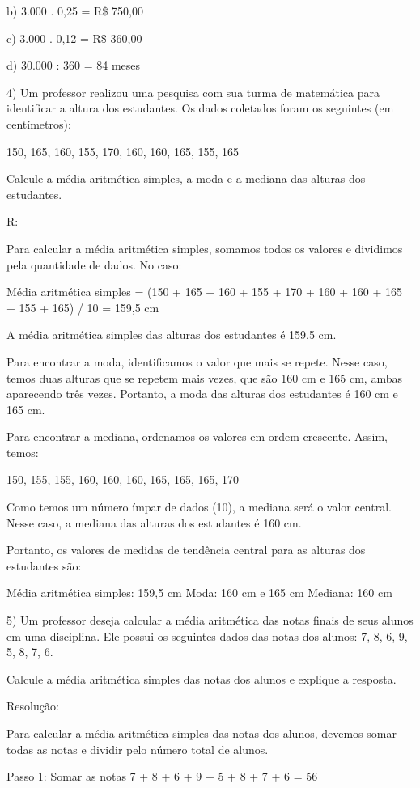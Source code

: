 b) 3.000 . 0,25 = R\$ 750,00

c) 3.000 . 0,12 = R\$ 360,00

d) 30.000 : 360 = 84 meses

4) Um professor realizou uma pesquisa com sua turma de matemática para
identificar a altura dos estudantes. Os dados coletados foram os
seguintes (em centímetros):

150, 165, 160, 155, 170, 160, 160, 165, 155, 165

Calcule a média aritmética simples, a moda e a mediana das alturas dos
estudantes.

R:

Para calcular a média aritmética simples, somamos todos os valores e
dividimos pela quantidade de dados. No caso:

Média aritmética simples = (150 + 165 + 160 + 155 + 170 + 160 + 160 +
165 + 155 + 165) / 10 = 159,5 cm

A média aritmética simples das alturas dos estudantes é 159,5 cm.

Para encontrar a moda, identificamos o valor que mais se repete. Nesse
caso, temos duas alturas que se repetem mais vezes, que são 160 cm e 165
cm, ambas aparecendo três vezes. Portanto, a moda das alturas dos
estudantes é 160 cm e 165 cm.

Para encontrar a mediana, ordenamos os valores em ordem crescente.
Assim, temos:

150, 155, 155, 160, 160, 160, 165, 165, 165, 170

Como temos um número ímpar de dados (10), a mediana será o valor
central. Nesse caso, a mediana das alturas dos estudantes é 160 cm.

Portanto, os valores de medidas de tendência central para as alturas dos
estudantes são:

Média aritmética simples: 159,5 cm Moda: 160 cm e 165 cm Mediana: 160 cm

5) Um professor deseja calcular a média aritmética das notas finais de
seus alunos em uma disciplina. Ele possui os seguintes dados das notas
dos alunos: 7, 8, 6, 9, 5, 8, 7, 6.

Calcule a média aritmética simples das notas dos alunos e explique a
resposta.

Resolução:

Para calcular a média aritmética simples das notas dos alunos, devemos
somar todas as notas e dividir pelo número total de alunos.

Passo 1: Somar as notas 7 + 8 + 6 + 9 + 5 + 8 + 7 + 6 = 56

